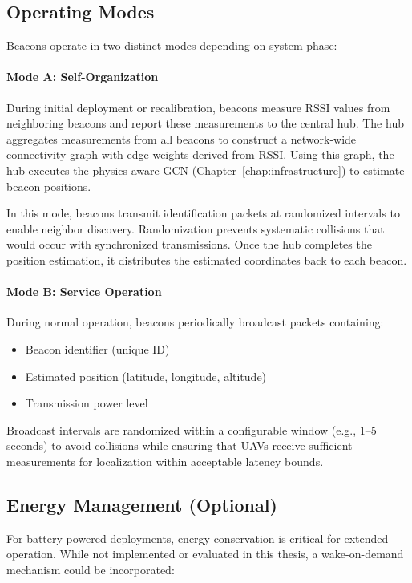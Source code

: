 \documentclass[master,final,11pt]{iscs-thesis}
\begin{document}
\subsection{Operating Modes}

Beacons operate in two distinct modes depending on system phase:

\paragraph{Mode A: Self-Organization}
During initial deployment or recalibration, beacons measure RSSI values from neighboring beacons and report these measurements to the central hub.
The hub aggregates measurements from all beacons to construct a network-wide connectivity graph with edge weights derived from RSSI.
Using this graph, the hub executes the physics-aware GCN (Chapter~\ref{chap:infrastructure}) to estimate beacon positions.

In this mode, beacons transmit identification packets at randomized intervals to enable neighbor discovery.
Randomization prevents systematic collisions that would occur with synchronized transmissions.
Once the hub completes the position estimation, it distributes the estimated coordinates back to each beacon.

\paragraph{Mode B: Service Operation}
During normal operation, beacons periodically broadcast packets containing:
\begin{itemize}
    \item Beacon identifier (unique ID)
    \item Estimated position (latitude, longitude, altitude)
    \item Transmission power level
\end{itemize}

Broadcast intervals are randomized within a configurable window (e.g., 1--5 seconds) to avoid collisions while ensuring that UAVs receive sufficient measurements for localization within acceptable latency bounds.

\subsection{Energy Management (Optional)}

For battery-powered deployments, energy conservation is critical for extended operation.
While not implemented or evaluated in this thesis, a wake-on-demand mechanism could be incorporated:
\end{document}
